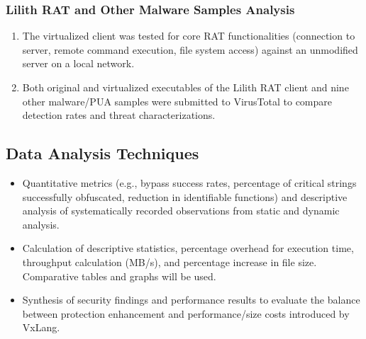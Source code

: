 \subsubsection{Lilith RAT and Other Malware Samples Analysis}
\begin{enumerate}
    \item {} The virtualized client was tested for core RAT functionalities (connection to server, remote command execution, file system access) against an unmodified server on a local network.
    \item {} Both original and virtualized executables of the Lilith RAT client and nine other malware/PUA samples were submitted to VirusTotal to compare detection rates and threat characterizations.
\end{enumerate}

\subsection{Data Analysis Techniques}
\begin{itemize}
    \item {} Quantitative metrics (e.g., bypass success rates, percentage of critical strings successfully obfuscated, reduction in identifiable functions) and descriptive analysis of systematically recorded observations from static and dynamic analysis.
    \item {} Calculation of descriptive statistics, percentage overhead for execution time, throughput calculation (MB/s), and percentage increase in file size. Comparative tables and graphs will be used.
    \item {} Synthesis of security findings and performance results to evaluate the balance between protection enhancement and performance/size costs introduced by VxLang.
\end{itemize}
